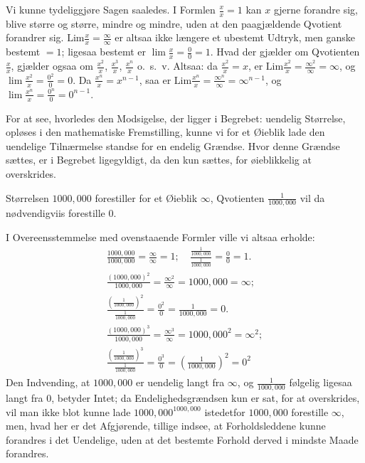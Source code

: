 \documentclass[12pt]{book}
\newcommand{\opage}[1]{\marginnote{\footnotesize\textit{[#1]}}}
\begin{document}
Vi kunne tydeliggjøre Sagen saaledes. I Formlen $\frac{x}{x} = 1$ kan $x$ gjerne
forandre sig, blive større og større, mindre og mindre, uden at den paagjældende
Qvotient forandrer sig. $\mathrm{Lim}\frac{x}{x} = \frac{\infty}{\infty}$ er
altsaa ikke længere et ubestemt Udtryk, men ganske bestemt $= 1$; ligesaa bestemt
er $\lim\frac{x}{x} = \frac{0}{0} = 1$. Hvad der gjælder om Qvotienten
$\frac{x}{x}$,
gjælder ogsaa om $\frac{x^{2}}{x}$, $\frac{x^{3}}{x}$, $\frac{x^{n}}{x}$ o.\ s.\
v. Altsaa: da $\frac{x^{2}}{x} = x$, er $\mathrm{Lim}\frac{x^{2}}{x} =
\frac{\infty^{2}}{\infty} = \infty$, og $\lim\frac{x^{2}}{x} = \frac{0^{2}}{0}
= 0$. Da $\frac{x^{n}}{x} = x^{n-1}$, saa er $\mathrm{Lim}\frac{x^{n}}{x} =
\frac{\infty^{n}}{\infty} = \infty^{n-1}$, og $\lim\frac{x^{n}}{x} =
\frac{0^{n}}{0} = 0^{n-1}$.

For at see, hvorledes den Modsigelse, der ligger i Begrebet: uendelig Størrelse,
opløses i den mathematiske Fremstilling, kunne vi for et Øieblik lade den
uendelige Tilnærmelse standse for en endelig Grændse. Hvor denne
\opage{50} Grændse sættes, er i Begrebet ligegyldigt, da den kun sættes, for øieblikkelig at
overskrides.

Størrelsen $1000{,}000$ forestiller for et Øieblik $\infty$, Qvotienten
$\frac{1}{1000{,}000}$ vil da nødvendigviis forestille 0.

I Overeensstemmelse med ovenstaaende Formler ville vi altsaa erholde:
\begin{gather*}
\frac{1000{,}000}{1000{,}000} = \frac{\infty}{\infty} = 1; \quad
\frac{\frac{1}{1000{,}000}}{\frac{1}{1000{,}000}} = \frac{0}{0} = 1.\\
\frac{(1000{,}000)^{2}}{1000{,}000} = \frac{\infty^{2}}{\infty}
= 1000{,}000 = \infty;\\
\frac{\left(\frac{1}{1000{,}000}\right)^{2}}{\frac{1}{1000{,}000}}
= \frac{0^{2}}{0} = \frac{1}{1000{,}000} = 0.\\
\frac{(1000{,}000)^{3}}{1000{,}000} = \frac{\infty^{3}}{\infty}
= 1000{,}000^{2} = \infty^{2};\\
\frac{\left(\frac{1}{1000{,}000}\right)^{3}}{\frac{1}{1000{,}000}}
= \frac{0^{3}}{0} = \left(\frac{1}{1000{,}000}\right)^{2} = 0^{2}
\end{gather*}
Den Indvending, at $1000{,}000$ er uendelig langt fra $\infty$, og
$\frac{1}{1000{,}000}$ følgelig ligesaa langt fra 0, betyder Intet; da
Endelighedsgrændsen kun er sat, for at overskrides, vil man ikke blot kunne lade
$1000{,}000^{1000{,}000}$ istedetfor $1000{,}000$ forestille $\infty$,
men, hvad her er det Afgjørende, tillige indsee, at Forholdsleddene kunne
forandres i det Uendelige, uden at det bestemte Forhold derved i mindste Maade
forandres.
\end{document}
